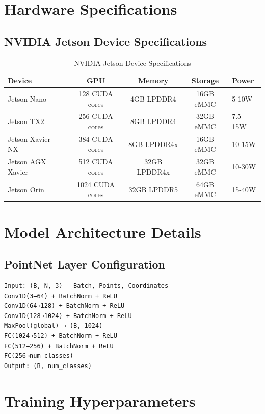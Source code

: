 \documentclass[12pt,a4paper]{report}
\begin{document}
\chapter{Hardware Specifications}

\section{NVIDIA Jetson Device Specifications}

\begin{table}[htbp]
\centering
\caption{NVIDIA Jetson Device Specifications}
\label{tab:jetson_specs}
\begin{tabular}{@{}lcccl@{}}
\toprule
Device & GPU & Memory & Storage & Power \\
\midrule
Jetson Nano & 128 CUDA cores & 4GB LPDDR4 & 16GB eMMC & 5-10W \\
Jetson TX2 & 256 CUDA cores & 8GB LPDDR4 & 32GB eMMC & 7.5-15W \\
Jetson Xavier NX & 384 CUDA cores & 8GB LPDDR4x & 16GB eMMC & 10-15W \\
Jetson AGX Xavier & 512 CUDA cores & 32GB LPDDR4x & 32GB eMMC & 10-30W \\
Jetson Orin & 1024 CUDA cores & 32GB LPDDR5 & 64GB eMMC & 15-40W \\
\bottomrule
\end{tabular}
\end{table}

\chapter{Model Architecture Details}

\section{PointNet Layer Configuration}

\begin{verbatim}
Input: (B, N, 3) - Batch, Points, Coordinates
Conv1D(3→64) + BatchNorm + ReLU
Conv1D(64→128) + BatchNorm + ReLU
Conv1D(128→1024) + BatchNorm + ReLU
MaxPool(global) → (B, 1024)
FC(1024→512) + BatchNorm + ReLU
FC(512→256) + BatchNorm + ReLU
FC(256→num_classes)
Output: (B, num_classes)
\end{verbatim}

\chapter{Training Hyperparameters}
\end{document}
